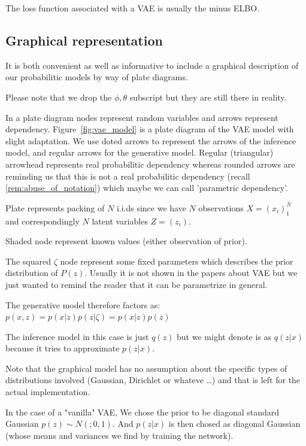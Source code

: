 \documentclass[11pt, a4paper]{report}
\theoremstyle{plain}
\theoremstyle{definition}
\theoremstyle{remark}
\begin{document}
The loss function associated with a VAE is usually the minus ELBO.



\subsection{Graphical representation}


It is both convenient as well as informative to include a graphical description
of our probabilitic models by way of plate diagrams.

Please note that we drop the $\phi, \theta$ subscript but they are still there
in reality.

In a plate diagram nodes represent random variables and arrows
represent dependency.
Figure~\ref{fig:vae_model} is a plate diagram of the VAE model with slight
adaptation. We use doted arrows to represent the arrows of the inference model,
and regular arrows for the generative model. Regular (triangular) arrowhead
represents real probabilitic dependency whereas rounded arrows are reminding us
that this is not a real probabilitic dependency (recall
\ref{rem:abuse_of_notation}) which maybe we can call 'parametric
dependency'.

Plate represents packing of $N$ i.i.ds since we have $N$ observations $X =
(x_i)_1^N$ and correspondingly $N$ latent variables $Z = (z_i)$.

Shaded node represent known values (either observation of prior).

The squared $\zeta$ node represent some fixed parameters which describes the
prior distribution of $P(z)$. Usually it is not shown in the papers about VAE
but we just wanted to remind the reader that it can be parametrize in general.

The generative model therefore factors as: $p(x,z) = p(x|z)p(z|\zeta) =
p(x|z)p(z)$

The inference model in this case is just $q(z)$ but we might denote is as
$q(z|x)$ because it tries to approximate $p(z|x)$.

Note that the graphical model has no assumption about the specific types of
distributions involved (Gaussian, Dirichlet or whateve \dots) and that is left
for the actual implementation.

In the case of a "vanilla" VAE, We chose the prior to be diagonal standard Gaussian
$p(z) \sim N(;0,1)$. And $p(z | x)$ is then chosed as diagonal Gaussian (whose
means and variances we find by training the network).
\end{document}
